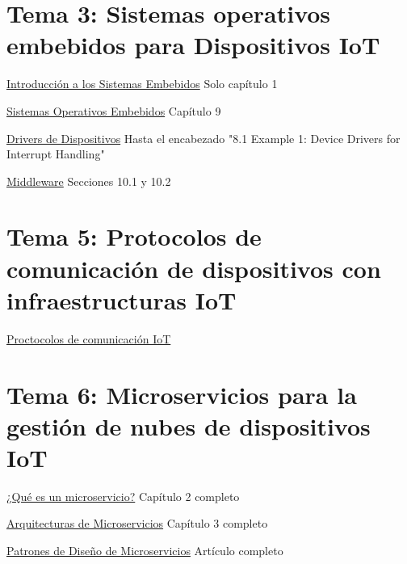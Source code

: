 \documentclass[12pt]{report} %
\begin{document}
\section{Tema 3: Sistemas operativos embebidos para Dispositivos IoT}
\href{https://learning.oreilly.com/library/view/embedded-systems-architecture/9780123821966/xhtml/CHP001.html#CHP001titl}{Introducción a los Sistemas Embebidos} Solo capítulo 1

\href{https://learning.oreilly.com/library/view/embedded-systems-architecture/9780123821966/xhtml/CHP009.html#CHP009titl}{Sistemas Operativos Embebidos} Capítulo 9

\href{https://learning.oreilly.com/library/view/embedded-systems-architecture/9780123821966/xhtml/CHP008.html#CHP008titl}{Drivers de Dispositivos} Hasta el encabezado "8.1 Example 1: Device Drivers for Interrupt Handling"

\href{https://learning.oreilly.com/library/view/embedded-systems-architecture/9780123821966/xhtml/CHP010.html#CHP010titl}{Middleware} Secciones 10.1 y 10.2

\section{Tema 5: Protocolos de comunicación de dispositivos con infraestructuras IoT}
\href{https://learning.oreilly.com/library/view/internet-of-things/9781788470599/b34f5cd8-115c-490c-b5c2-38a3a966a65a.xhtml}{Proctocolos de comunicación IoT}

\section{Tema 6: Microservicios para la gestión de nubes de dispositivos IoT}
\href{https://learning.oreilly.com/library/view/microservices-iot-and/9781484212752/9781484212769_Ch02.xhtml}{¿Qué es un microservicio?} Capítulo 2 completo

\href{https://learning.oreilly.com/library/view/microservices-iot-and/9781484212752/9781484212769_Ch03.xhtml}{Arquitecturas de Microservicios} Capítulo 3 completo

\href{https://towardsdatascience.com/microservice-architecture-and-its-10-most-important-design-patterns-824952d7fa41}{Patrones de Diseño de Microservicios} Artículo completo
\end{document}
